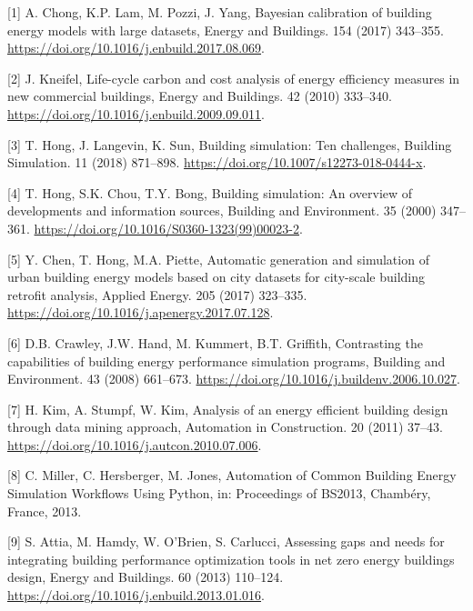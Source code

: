 \documentclass[3p, times]{elsarticle} %
\begin{document}
\hypertarget{refs}{}
\leavevmode\hypertarget{ref-Chong2017}{}%
{[}1{]} A. Chong, K.P. Lam, M. Pozzi, J. Yang, Bayesian calibration of building energy models with large datasets, Energy and Buildings. 154 (2017) 343--355. \url{https://doi.org/10.1016/j.enbuild.2017.08.069}.

\leavevmode\hypertarget{ref-Kneifel2010}{}%
{[}2{]} J. Kneifel, Life-cycle carbon and cost analysis of energy efficiency measures in new commercial buildings, Energy and Buildings. 42 (2010) 333--340. \url{https://doi.org/10.1016/j.enbuild.2009.09.011}.

\leavevmode\hypertarget{ref-Hong2018}{}%
{[}3{]} T. Hong, J. Langevin, K. Sun, Building simulation: Ten challenges, Building Simulation. 11 (2018) 871--898. \url{https://doi.org/10.1007/s12273-018-0444-x}.

\leavevmode\hypertarget{ref-Hong2000}{}%
{[}4{]} T. Hong, S.K. Chou, T.Y. Bong, Building simulation: An overview of developments and information sources, Building and Environment. 35 (2000) 347--361. \url{https://doi.org/10.1016/S0360-1323(99)00023-2}.

\leavevmode\hypertarget{ref-Chen2017Automatic}{}%
{[}5{]} Y. Chen, T. Hong, M.A. Piette, Automatic generation and simulation of urban building energy models based on city datasets for city-scale building retrofit analysis, Applied Energy. 205 (2017) 323--335. \url{https://doi.org/10.1016/j.apenergy.2017.07.128}.

\leavevmode\hypertarget{ref-Crawley2008a}{}%
{[}6{]} D.B. Crawley, J.W. Hand, M. Kummert, B.T. Griffith, Contrasting the capabilities of building energy performance simulation programs, Building and Environment. 43 (2008) 661--673. \url{https://doi.org/10.1016/j.buildenv.2006.10.027}.

\leavevmode\hypertarget{ref-Kim2011}{}%
{[}7{]} H. Kim, A. Stumpf, W. Kim, Analysis of an energy efficient building design through data mining approach, Automation in Construction. 20 (2011) 37--43. \url{https://doi.org/10.1016/j.autcon.2010.07.006}.

\leavevmode\hypertarget{ref-Miller2013}{}%
{[}8{]} C. Miller, C. Hersberger, M. Jones, Automation of Common Building Energy Simulation Workflows Using Python, in: Proceedings of BS2013, Chambéry, France, 2013.

\leavevmode\hypertarget{ref-Attia2013a}{}%
{[}9{]} S. Attia, M. Hamdy, W. O'Brien, S. Carlucci, Assessing gaps and needs for integrating building performance optimization tools in net zero energy buildings design, Energy and Buildings. 60 (2013) 110--124. \url{https://doi.org/10.1016/j.enbuild.2013.01.016}.
\end{document}
